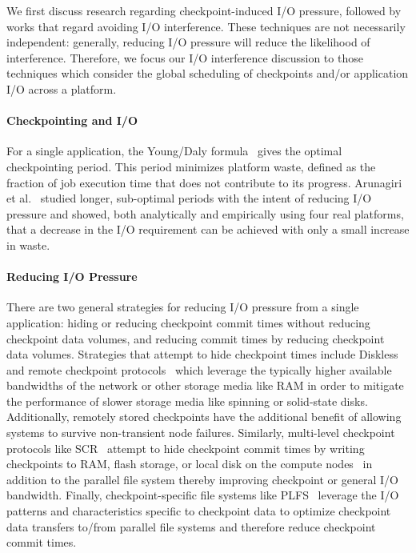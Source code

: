 \documentclass[conference,nofonttune]{IEEEtran}
\begin{document}
We first discuss research regarding checkpoint-induced I/O pressure, followed by
works that regard avoiding I/O interference.  These techniques are not necessarily
independent: generally, reducing I/O pressure will reduce the likelihood of
interference.  Therefore, we focus our I/O interference discussion to those
techniques which consider the global scheduling of checkpoints and/or application I/O
across a platform.


\paragraph*{Checkpointing and I/O}

For a single application, the Young/Daly formula~\cite{young74,daly04} gives the
optimal checkpointing period. This period minimizes platform waste, defined as the
fraction of job execution time that does not contribute to its progress. 
Arunagiri et
al.~\cite{Arunagiri2010} studied longer, sub-optimal periods with the intent of
reducing I/O pressure and showed, both analytically and empirically using four real
platforms, that a decrease in the I/O requirement can be achieved with only a small
increase in waste.

\paragraph*{Reducing I/O Pressure}

There are two general strategies for reducing I/O pressure from a single application:
hiding or reducing checkpoint commit times without reducing checkpoint data volumes,
and reducing commit times by reducing checkpoint data volumes.  Strategies that
attempt to hide checkpoint times include Diskless~\cite{Plank98Diskless} and remote
checkpoint protocols~\cite{Cornwell11RemoteBLCR} which leverage the typically higher
available bandwidths of the network or other storage media like RAM in order to
mitigate the performance of slower storage media like spinning or solid-state
disks. Additionally, remotely stored checkpoints have the additional benefit of
allowing systems to survive non-transient node failures. Similarly, multi-level
checkpoint protocols like SCR~\cite{Moody10SCR,Vaidya95TwoLevel} attempt to hide
checkpoint commit times by writing checkpoints to RAM, flash storage, or local disk
on the compute nodes~\cite{Kougkas2017} in addition to the parallel file system
thereby improving checkpoint or general I/O bandwidth.  Finally, checkpoint-specific
file systems like PLFS~\cite{Bent09PLFS} leverage the I/O patterns and
characteristics specific to checkpoint data to optimize checkpoint data transfers
to/from parallel file systems and therefore reduce checkpoint commit times.
\end{document}
